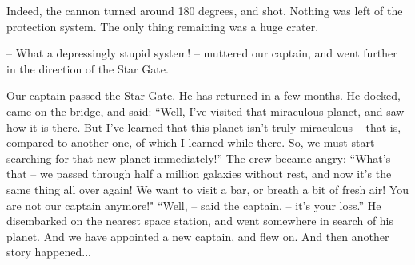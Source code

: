 \documentclass[ebook,twoside,final,openright]{memoir}
\begin{document}
\par
Indeed, the cannon turned around 180 degrees, and shot. Nothing was left of the protection system. The only thing remaining was a huge crater.\par
– What a depressingly stupid system! – muttered our captain, and went further in the direction of the Star Gate.\par
\par
Our captain passed the Star Gate. He has returned in a few months. He docked, came on the bridge, and said: “Well, I’ve visited that miraculous planet, and saw how it is there. But I’ve learned that this planet isn’t truly miraculous – that is, compared to another one, of which I learned while there. So, we must start searching for that new planet immediately!” The crew became angry: “What’s that – we passed through half a million galaxies without rest, and now it’s the same thing all over again! We want to visit a bar, or breath a bit of fresh air! You are not our captain anymore!" “Well, – said the captain, – it’s your loss.” He disembarked on the nearest space station, and went somewhere in search of his planet. And we have appointed a new captain, and flew on. And then another story happened...
\end{document}
